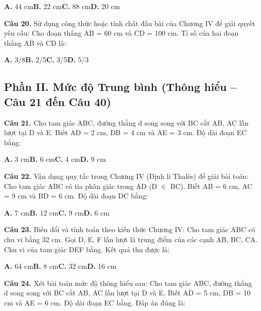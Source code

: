 \documentclass[11pt,a4paper]{article}
\begin{document}
\hspace*{1.5em}\textbf{A.} 44 cm\quad\quad \textbf{B.} 22 cm\quad\quad \textbf{C.} 88 cm\quad\quad \textbf{D.} 20 cm\par\vspace{2pt}
\textbf{\color{primary} Câu 20.} Sử dụng công thức hoặc tính chất đầu bài của Chương IV để giải quyết yêu cầu: Cho đoạn thẳng AB = 60 cm và CD = 100 cm. Tỉ số của hai đoạn thẳng AB và CD là:\par
\hspace*{1.5em}\textbf{A.} 3/8\quad\quad \textbf{B.} 2/5\quad\quad \textbf{C.} 3/5\quad\quad \textbf{D.} 5/3\par\vspace{2pt}
\subsection*{\color{accent} Phần II. Mức độ Trung bình (Thông hiểu -- Câu 21 đến Câu 40)}
\textbf{\color{primary} Câu 21.} Cho tam giác ABC, đường thẳng d song song với BC cắt AB, AC lần lượt tại D và E. Biết AD = 2 cm, DB = 4 cm và AE = 3 cm. Độ dài đoạn EC bằng:\par
\hspace*{1.5em}\textbf{A.} 3 cm\quad\quad \textbf{B.} 6 cm\quad\quad \textbf{C.} 4 cm\quad\quad \textbf{D.} 9 cm\par\vspace{2pt}
\textbf{\color{primary} Câu 22.} Vận dụng quy tắc trong Chương IV (Định lí Thalès) để giải bài toán: Cho tam giác ABC có tia phân giác trong AD (D $\in$ BC). Biết AB = 6 cm, AC = 9 cm và BD = 6 cm. Độ dài đoạn DC bằng:\par
\hspace*{1.5em}\textbf{A.} 7 cm\quad\quad \textbf{B.} 12 cm\quad\quad \textbf{C.} 9 cm\quad\quad \textbf{D.} 6 cm\par\vspace{2pt}
\textbf{\color{primary} Câu 23.} Biến đổi và tính toán theo kiến thức Chương IV: Cho tam giác ABC có chu vi bằng 32 cm. Gọi D, E, F lần lượt là trung điểm của các cạnh AB, BC, CA. Chu vi của tam giác DEF bằng. Kết quả thu được là:\par
\hspace*{1.5em}\textbf{A.} 64 cm\quad\quad \textbf{B.} 8 cm\quad\quad \textbf{C.} 32 cm\quad\quad \textbf{D.} 16 cm\par\vspace{2pt}
\textbf{\color{primary} Câu 24.} Xét bài toán mức độ thông hiểu sau: Cho tam giác ABC, đường thẳng d song song với BC cắt AB, AC lần lượt tại D và E. Biết AD = 5 cm, DB = 10 cm và AE = 6 cm. Độ dài đoạn EC bằng. Đáp án đúng là:\par
\end{document}
